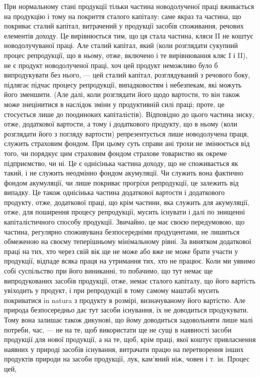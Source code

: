 При нормальному стані продукції тільки частина новодолученої праці
вживається на продукцію і тому на покриття сталого капіталу: саме якраз та
частина, що покриває сталий капітал, витрачений у продукції засобів споживання,
речових елементів доходу. Це вирівнюється тим, що ця стала частина,
кляси II не коштує новодолучуваної праці. Але сталий капітал, який (коли розглядати
сукупний процес репродукції, що в ньому, отже, включено і те вирівнювання
кляс І і II), не є продукт новодолученої праці, хоч цей продукт неможливо
було б випродукувати без нього, — цей сталий капітал, розглядуваний з речового
боку, підлягає підчас процесу репродукції, випадковостям і небезпекам,
які можуть його зменшити. (Але далі, коли розглядати його щодо вартости, то
він також може знецінитися в наслідок зміни у продуктивній силі праці;
проте, це стосується лише до поодиноких капіталістів). Відповідно до цього частина
зиску, отже, додаткової вартости, а тому і додаткового продукту, що в ньому
(коли розглядати його з погляду вартости) репрезентується лише новодолучена
праця, служить страховим фондом. При цьому суть справи ані трохи не змінюється
від того, чи порядкує цим страховим фондом страхове товариство як
окреме підприємство, чи ні. Це є однісінька частина доходу, що не споживається
як такий, і не служить неодмінно фондом акумуляції. Чи служить вона фактично
фондом акумуляції, чи лише покриває прогріхи репродукції, це залежить від
випадку. Це також однісінька частина додаткової вартости і додаткового продукту,
отже, додаткової праці, що крім частини, яка служить для акумуляції, отже,
для поширення процесу репродукції, мусить існувати і далі по знищенні
капіталістичного способу продукції. Звичайно, це має своєю передумовою, що
частина, регулярно споживувана безпосередніми продуцентами, не лишиться обмеженою на своєму
теперішньому мінімальному рівні. За винятком додаткової
праці на тих, хто через свій вік ще не може або вже не може брати участи у продукції,
відпаде всяка праця на утримання тих, хто не працює. Коли ми уявимо
собі суспільство при його виниканні, то побачимо, що тут немає ще випродукованих
засобів продукції, отже, немає сталого капіталу, що його вартість увіходить
у продукт, і при репродукції в тому самому маштабі мусить покриватися
in natura з продукту в розмірі, визначуваному його вартістю. Але природа
безпосередньо дає тут засоби існування, їх не доводиться продукувати. Тому
вона залишає також дикунові, що йому доводиться задовольняти лише малі потреби,
час, — не на те, щоб використати ще не сущі в наявності засоби продукції для
нової продукції, а на те, щоб, крім праці, якої коштує привласнення наявних
у природі засобів існування, витрачати працю на перетворення інших продуктів
природи на засоби продукції, лук, кам’яний ніж, човен і т. ін. Процес цей,

